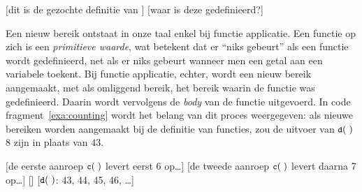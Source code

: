\begin{NoBreak}
\codeFragmentCaption
\begin{codelines}
  \codeLine{}
  [dit is de gezochte definitie van ]
  [waar is deze  gedefinieerd?]
\end{codelines}
\end{NoBreak}


Een nieuw bereik ontstaat in onze taal enkel bij functie applicatie. Een functie op zich is een \emph{primitieve waarde}, wat betekent dat er “niks gebeurt” als een functie wordt gedefinieerd, net als er niks gebeurt wanneer men een getal aan een variabele toekent. Bij functie applicatie, echter, wordt een nieuw bereik aangemaakt, met als omliggend bereik, het bereik waarin de functie was gedefinieerd. Daarin wordt vervolgens de \emph{body} van de functie uitgevoerd. In code fragment~\ref{exa:counting} wordt het belang van dit proces weergegeven: als nieuwe bereiken worden aangemaakt bij de definitie van functies, zou de uitvoer van $\text{\ttfamily\small\upshape d}(\;)$ 8 zijn in plaats van 43.

\begin{NoBreak}
\codeFragmentCaption
\begin{codelines}
  \codeLine{}
  [de eerste aanroep $\text{\ttfamily\small\upshape c}(\;)$ levert eerst 6 op\dots]
  [de tweede aanroep $\text{\ttfamily\small\upshape c}(\;)$ levert daarna 7 op\dots]
  \codeLine{}[]
  [$\text{\ttfamily\small\upshape d}(\;)$: 43, 44, 45, 46, \dots]
\end{codelines}
\end{NoBreak}

